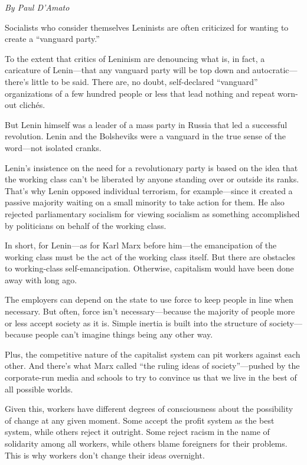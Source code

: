 \emph{By Paul D'Amato}

Socialists who consider themselves Leninists are often criticized for wanting to create a ``vanguard party.''

To the extent that critics of Leninism are denouncing what is, in fact, a caricature of Lenin---that any vanguard party will be top down and autocratic---there's little to be said. There are, no doubt, self-declared ``vanguard'' organizations of a few hundred people or less that lead nothing and repeat worn-out clich\'{e}s.

But Lenin himself was a leader of a mass party in Russia that led a successful revolution. Lenin and the Bolsheviks were a vanguard in the true sense of the word---not isolated cranks.

Lenin's insistence on the need for a revolutionary party is based on the idea that the working class can't be liberated by anyone standing over or outside its ranks. That's why Lenin opposed individual terrorism, for example---since it created a passive majority waiting on a small minority to take action for them. He also rejected parliamentary socialism for viewing socialism as something accomplished by politicians on behalf of the working class.

In short, for Lenin---as for Karl Marx before him---the emancipation of the working class must be the act of the working class itself. But there are obstacles to working-class self-emancipation. Otherwise, capitalism would have been done away with long ago.

The employers can depend on the state to use force to keep people in line when necessary. But often, force isn't necessary---because the majority of people more or less accept society as it is. Simple inertia is built into the structure of society---because people can't imagine things being any other way.

Plus, the competitive nature of the capitalist system can pit workers against each other. And there's what Marx called ``the ruling ideas of society''---pushed by the corporate-run media and schools to try to convince us that we live in the best of all possible worlds.

Given this, workers have different degrees of consciousness about the possibility of change at any given moment. Some accept the profit system as the best system, while others reject it outright. Some reject racism in the name of solidarity among all workers, while others blame foreigners for their problems. This is why workers don't change their ideas overnight.

